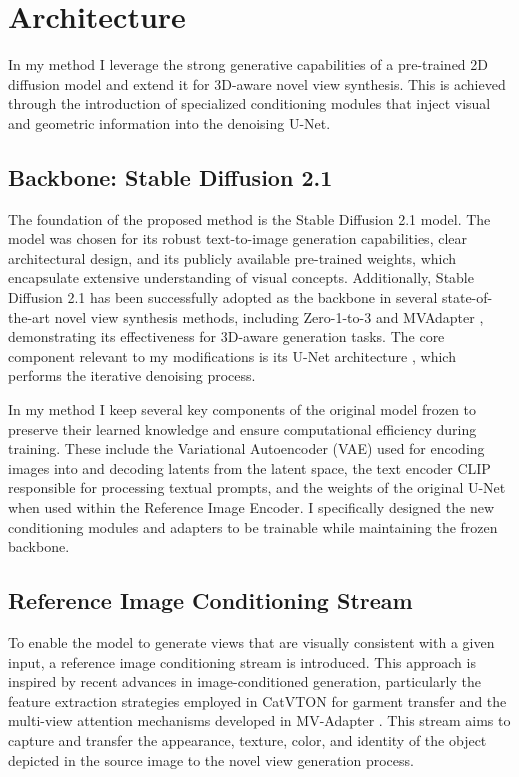 \section{Architecture}\label{sec:architectural-framework}
In my method I leverage the strong generative capabilities of a pre-trained 2D diffusion model and extend it for 3D-aware novel view synthesis. This is achieved through the introduction of specialized conditioning modules that inject visual and geometric information into the denoising U-Net.

\subsection{Backbone: Stable Diffusion 2.1}
The foundation of the proposed method is the Stable Diffusion 2.1 model. The model was chosen for its robust text-to-image generation capabilities, clear architectural design, and its publicly available pre-trained weights, which encapsulate extensive understanding of visual concepts. Additionally, Stable Diffusion 2.1 has been successfully adopted as the backbone in several state-of-the-art novel view synthesis methods, including Zero-1-to-3 \cite{zero1to3} and MVAdapter \cite{mvadapter}, demonstrating its effectiveness for 3D-aware generation tasks. The core component relevant to my modifications is its U-Net architecture \cite{unet}, which performs the iterative denoising process.

In my method I keep several key components of the original model frozen to preserve their learned knowledge and ensure computational efficiency during training. These include the Variational Autoencoder (VAE) \cite{vae} used for encoding images into and decoding latents from the latent space, the text encoder CLIP \cite{clip} responsible for processing textual prompts, and the weights of the original U-Net when used within the Reference Image Encoder. I specifically designed the new conditioning modules and adapters to be trainable while maintaining the frozen backbone.

\subsection{Reference Image Conditioning Stream}
To enable the model to generate views that are visually consistent with a given input, a reference image conditioning stream is introduced. This approach is inspired by recent advances in image-conditioned generation, particularly the feature extraction strategies employed in CatVTON \cite{catvton} for garment transfer and the multi-view attention mechanisms developed in MV-Adapter \cite{mvadapter}. This stream aims to capture and transfer the appearance, texture, color, and identity of the object depicted in the source image to the novel view generation process.

